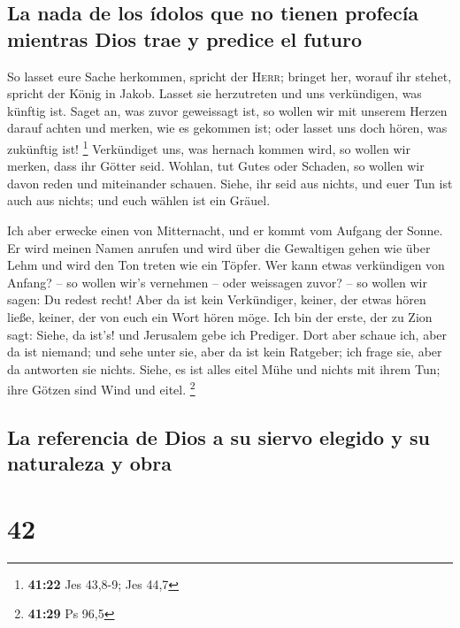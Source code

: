 \hypertarget{la-nada-de-los-uxeddolos-que-no-tienen-profecuxeda-mientras-dios-trae-y-predice-el-futuro}{%
\subsection{La nada de los ídolos que no tienen profecía mientras Dios
trae y predice el
futuro}\label{la-nada-de-los-uxeddolos-que-no-tienen-profecuxeda-mientras-dios-trae-y-predice-el-futuro}}

 So lasset eure Sache herkommen, spricht der
\textsc{Herr}; bringet her, worauf ihr stehet, spricht der König in
Jakob.  Lasset sie herzutreten und uns verkündigen, was
künftig ist. Saget an, was zuvor geweissagt ist, so wollen wir mit
unserem Herzen darauf achten und merken, wie es gekommen ist; oder
lasset uns doch hören, was zukünftig ist! \footnote{\textbf{41:22} Jes
  43,8-9; Jes 44,7}  Verkündiget uns, was hernach kommen
wird, so wollen wir merken, dass ihr Götter seid. Wohlan, tut Gutes oder
Schaden, so wollen wir davon reden und miteinander schauen.
 Siehe, ihr seid aus nichts, und euer Tun ist auch aus
nichts; und euch wählen ist ein Gräuel.

 Ich aber erwecke einen von Mitternacht, und er kommt vom
Aufgang der Sonne. Er wird meinen Namen anrufen und wird über die
Gewaltigen gehen wie über Lehm und wird den Ton treten wie ein Töpfer.
 Wer kann etwas verkündigen von Anfang? -- so wollen
wir's vernehmen -- oder weissagen zuvor? -- so wollen wir sagen: Du
redest recht! Aber da ist kein Verkündiger, keiner, der etwas hören
ließe, keiner, der von euch ein Wort hören möge.  Ich bin
der erste, der zu Zion sagt: Siehe, da ist's! und Jerusalem gebe ich
Prediger.  Dort aber schaue ich, aber da ist niemand; und
sehe unter sie, aber da ist kein Ratgeber; ich frage sie, aber da
antworten sie nichts.  Siehe, es ist alles eitel Mühe und
nichts mit ihrem Tun; ihre Götzen sind Wind und eitel. \footnote{\textbf{41:29}
  Ps 96,5}

\hypertarget{la-referencia-de-dios-a-su-siervo-elegido-y-su-naturaleza-y-obra}{%
\subsection{La referencia de Dios a su siervo elegido y su naturaleza y
obra}\label{la-referencia-de-dios-a-su-siervo-elegido-y-su-naturaleza-y-obra}}

\hypertarget{section-41}{%
\section{42}\label{section-41}}

